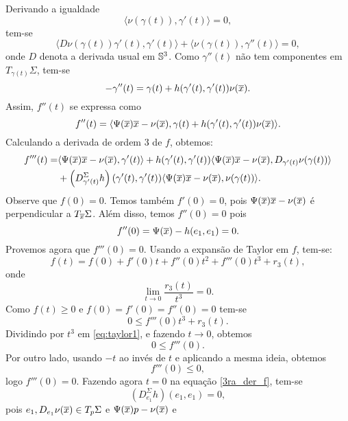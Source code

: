 \begin{demonstracao}
\begin{equation*}
\end{equation*}
Derivando a igualdade
\[
\langle \nu(\gamma(t)), \gamma'(t) \rangle = 0,
\]
tem-se
\[
\langle D \nu(\gamma(t)) \gamma'(t), \gamma'(t) \rangle + 
\langle \nu(\gamma(t)), \gamma''(t) \rangle = 0,
\]
onde $D$ denota a derivada usual em $\mathbb{S}^3$. Como $\gamma''(t)$ 
não tem componentes em $T_{\gamma(t)} \Sigma$, tem-se
\begin{equation*}
-\gamma''(t) = \gamma(t) + h(\gamma'(t), \gamma'(t)) \nu(\overline{x}).
\end{equation*}
Assim, $f''(t)$ se expressa como
\begin{equation*}
f''(t) = \langle \Psi(\overline{x}) \overline{x} - \nu(\overline{x}), \gamma(t) + h(\gamma'(t), 
\gamma'(t)) \nu(\overline{x}) \rangle.
\end{equation*}
Calculando a derivada de ordem $3$ de $f$, obtemos:
\begin{eqnarray}\label{3ra_der_f}
\begin{aligned}
f'''(t) =& \langle \Psi(\overline{x})\overline{x} - \nu(\overline{x}), \gamma'(t) \rangle + h(\gamma'(t), 
\gamma'(t)) \langle \Psi(\overline{x})\overline{x} - \nu(\overline{x}), D_{\gamma'(t)} \nu(\gamma(t)) 
\rangle \\
&+ \left( D_{\gamma'(t)}^{\Sigma} h \right) (\gamma'(t), \gamma'(t)) 
\langle \Psi(\overline{x})\overline{x} - \nu(\overline{x}), \nu(\gamma(t)) \rangle.
\end{aligned}
\end{eqnarray}
Observe que $f(0)=0$. Temos também $f'(0)=0$, pois 
$\Psi(\overline{x})\overline{x}-\nu(\overline{x})$ \'e perpendicular a $T_{\overline{x}}\Sigma$. 
Al\'em disso, temos $f''(0)=0$ pois
\[
f''(0) = \Psi(\overline{x}) - h(e_1,e_1)=0.
\]
Provemos agora que $f'''(0)=0$. Usando a expansão de Taylor em $f$,
tem-se:
\begin{equation*}
f(t) = f(0) + f'(0)t + f''(0)t^2 + f'''(0)t^3 + r_3(t),
\end{equation*}  
onde
\[
\lim_{t \rightarrow 0} \frac{r_3(t)}{t^3}=0.
\]
Como $f(t) \geq 0$ e $f(0)=f'(0)=f''(0)=0$ tem-se
\begin{equation} \label{eq:taylor1}
0 \leq f'''(0) t^3 + r_3(t).
\end{equation}
Dividindo por $t^3$ em \eqref{eq:taylor1}, e fazendo $t\to0$, obtemos
\[
0 \leq f'''(0).
\]
Por outro lado, usando $-t$ ao inv\'es de $t$ e aplicando a mesma ideia,
obtemos
\[
f'''(0) \leq 0,
\]
logo $f'''(0)=0$. Fazendo agora $t=0$ na equa\c c\~ao \eqref{3ra_der_f},
tem-se 
\begin{equation} \label{eq:taylor2}
(D_{e_1}^{\Sigma} h) (e_1,e_1) = 0,
\end{equation}
pois $e_1, D_{e_1} \nu(\overline{x}) \in T_p \Sigma$ e $\Psi(\overline{x})p - \nu(\overline{x})$ e 

\end{demonstracao}
